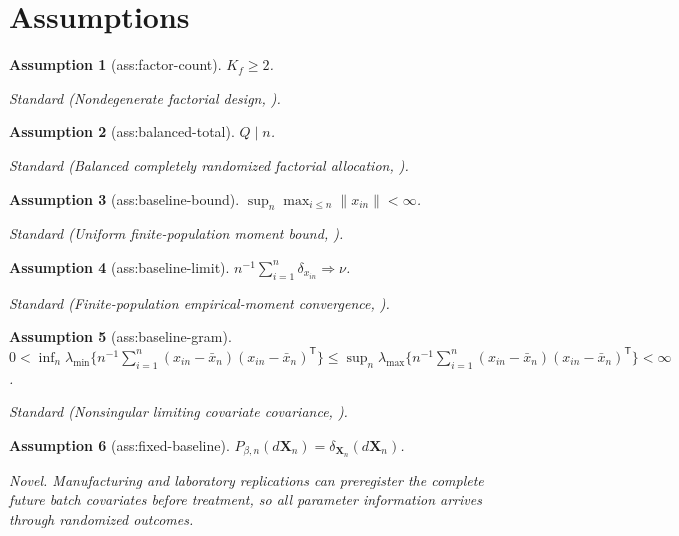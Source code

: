 \documentclass{article}
\newtheorem{assumption}{Assumption}
\begin{document}
\section{Assumptions}

\begin{assumption}[ass:factor-count]\label{ass:factor-count}
\(K_f\ge 2\).
\par\smallskip\noindent\emph{Standard} (Nondegenerate factorial design, \cite{BransonDasguptaRubin2016FactorialRerandomization}).
\end{assumption}

\begin{assumption}[ass:balanced-total]\label{ass:balanced-total}
\(Q\mid n\).
\par\smallskip\noindent\emph{Standard} (Balanced completely randomized factorial allocation, \cite{LiDingRubin2020FactorialRerandomization}).
\end{assumption}

\begin{assumption}[ass:baseline-bound]\label{ass:baseline-bound}
\(\sup_n\max_{i\le n}\lVert x_{in}\rVert<\infty\).
\par\smallskip\noindent\emph{Standard} (Uniform finite-population moment bound, \cite{LiDing2017FinitePopulationCLT}).
\end{assumption}

\begin{assumption}[ass:baseline-limit]\label{ass:baseline-limit}
\(n^{-1}\sum_{i=1}^{n}\delta_{x_{in}}\Rightarrow\nu\).
\par\smallskip\noindent\emph{Standard} (Finite-population empirical-moment convergence, \cite{LiDing2017FinitePopulationCLT}).
\end{assumption}

\begin{assumption}[ass:baseline-gram]\label{ass:baseline-gram}
\(0<\inf_n\lambda_{\min}\{n^{-1}\sum_{i=1}^{n}(x_{in}-\bar x_n)(x_{in}-\bar x_n)^{\mathsf T}\}\le\sup_n\lambda_{\max}\{n^{-1}\sum_{i=1}^{n}(x_{in}-\bar x_n)(x_{in}-\bar x_n)^{\mathsf T}\}<\infty\).
\par\smallskip\noindent\emph{Standard} (Nonsingular limiting covariate covariance, \cite{HanDeng2026DataAdaptiveFactorial}).
\end{assumption}

\begin{assumption}[ass:fixed-baseline]\label{ass:fixed-baseline}
\(P_{\beta,n}(d\mathbf X_n)=\delta_{\mathbf X_n}(d\mathbf X_n)\).
\par\smallskip\noindent\emph{Novel.} Manufacturing and laboratory replications can preregister the complete future batch covariates before treatment, so all parameter information arrives through randomized outcomes.
\end{assumption}
\end{document}
